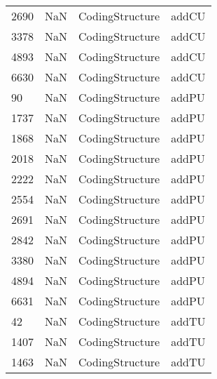 \begin{tabular}{llll}
2690 &                   NaN &            CodingStructure &                                     addCU \\
3378 &                   NaN &            CodingStructure &                                     addCU \\
4893 &                   NaN &            CodingStructure &                                     addCU \\
6630 &                   NaN &            CodingStructure &                                     addCU \\
90   &                   NaN &            CodingStructure &                                     addPU \\
1737 &                   NaN &            CodingStructure &                                     addPU \\
1868 &                   NaN &            CodingStructure &                                     addPU \\
2018 &                   NaN &            CodingStructure &                                     addPU \\
2222 &                   NaN &            CodingStructure &                                     addPU \\
2554 &                   NaN &            CodingStructure &                                     addPU \\
2691 &                   NaN &            CodingStructure &                                     addPU \\
2842 &                   NaN &            CodingStructure &                                     addPU \\
3380 &                   NaN &            CodingStructure &                                     addPU \\
4894 &                   NaN &            CodingStructure &                                     addPU \\
6631 &                   NaN &            CodingStructure &                                     addPU \\
42   &                   NaN &            CodingStructure &                                     addTU \\
1407 &                   NaN &            CodingStructure &                                     addTU \\
1463 &                   NaN &            CodingStructure &                                     addTU \\

\end{tabular}
